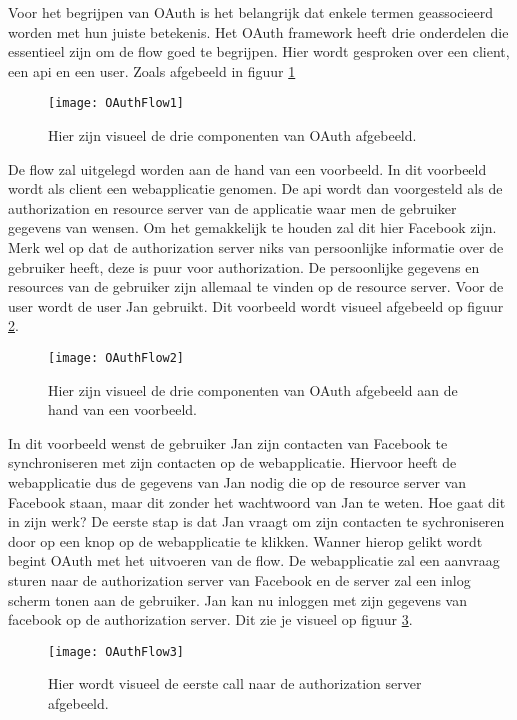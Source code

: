 Voor het begrijpen van OAuth is het belangrijk dat enkele termen geassocieerd worden met hun juiste betekenis. Het OAuth framework heeft drie onderdelen die essentieel zijn om de flow goed te begrijpen. Hier wordt gesproken over een client, een api en een user. Zoals afgebeeld in figuur \ref{fig:oauth1} 
\begin{figure}[H]
	\centering
	\texttt{[image: OAuthFlow1]} 
	\caption[Visueel de drie componenten]{Hier zijn visueel de drie componenten van OAuth afgebeeld.}
	\label{fig:oauth1}
\end{figure}
De flow zal uitgelegd worden aan de hand van een voorbeeld. In dit voorbeeld wordt als client een webapplicatie genomen. De api wordt dan voorgesteld als de authorization en resource server van de applicatie waar men de gebruiker gegevens van wensen. Om het gemakkelijk te houden zal dit hier Facebook zijn. Merk wel op dat de authorization server niks van persoonlijke informatie over de gebruiker heeft, deze is puur voor authorization. De persoonlijke gegevens en resources van de gebruiker zijn allemaal te vinden op de resource server. Voor de user wordt de user Jan gebruikt. Dit voorbeeld wordt visueel afgebeeld op figuur \ref{fig:oauth2}.
\begin{figure}[H]
	\centering
	\texttt{[image: OAuthFlow2]} 
	\caption[De drie componenten aan de hand van een voorbeeld]{Hier zijn visueel de drie componenten van OAuth afgebeeld aan de hand van een voorbeeld.}
	\label{fig:oauth2}
\end{figure}
In dit voorbeeld wenst de gebruiker Jan zijn contacten van Facebook te synchroniseren met zijn contacten op de webapplicatie. Hiervoor heeft de webapplicatie dus de gegevens van Jan nodig die op de resource server van Facebook staan, maar dit zonder het wachtwoord van Jan te weten. Hoe gaat dit in zijn werk?
De eerste stap is dat Jan vraagt om zijn contacten te sychroniseren door op een knop op de webapplicatie te klikken. Wanner hierop gelikt wordt begint OAuth met het uitvoeren van de flow. De webapplicatie zal een aanvraag sturen naar de authorization server van Facebook en de server zal een inlog scherm tonen aan de gebruiker. Jan kan nu inloggen met zijn gegevens van facebook op de authorization server. Dit zie je visueel op figuur \ref{fig:oauth3}.
\begin{figure}[H]
	\centering
	\texttt{[image: OAuthFlow3]} 
	\caption[Eerste call naar de authorization server]{Hier wordt visueel de eerste call naar de authorization server afgebeeld.}
	\label{fig:oauth3}
\end{figure}
